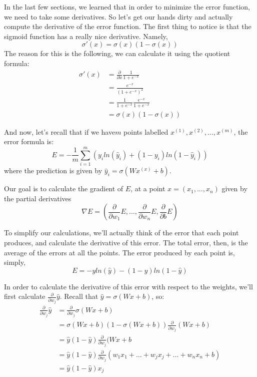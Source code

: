 In the last few sections, we learned that in order to minimize the error function, we need to take some derivatives. So let's get our hands dirty and actually compute the derivative of the error function. The first thing to notice is that the sigmoid function has a really nice derivative. Namely, \[\sigma'(x)=\sigma(x)(1-\sigma(x))\]
The reason for this is the following, we can calculate it using the quotient formula:
\[
\begin{split}
\sigma'(x) & = \frac{\partial}{\partial x} \frac{1}{1 + e^{-x}} \\
& = \frac{e^{-x}}{(1 + e^{-x})^2} \\
& = \frac{1}{1 + e^{-x}} \frac{e^{-x}}{1 + e^{-x}} \\
& = \sigma(x)(1-\sigma(x))
\end{split}
\]

And now, let's recall that if we have\(m\) points labelled \(x^{(1)}, x^{(2)}, ..., x^{(m)}\), the error formula is: \[E = -\frac{1}{m} \sum_{i=1}^m (y_i ln(\hat{y}_i) + (1 - y_i) ln(1 - \hat{y}_i))\]
where the prediction is given by \(\hat{y}_i = \sigma(Wx^{(x)} + b)\). \newline

Our goal is to calculate the gradient of \(E\), at a point \(x = (x_1, ..., x_n)\) given by the partial derivatives \[\nabla E = (\frac{\partial}{\partial w_1} E, …, \frac{\partial}{\partial w_n} E, \frac{\partial}{\partial b} E)\]

To simplify our calculations, we'll actually think of the error that each point produces, and calculate the derivative of this error. The total error, then, is the average of the errors at all the points. The error produced by each point is, simply,
\[E= -y ln(\hat{y}) - (1 - y) ln(1-\hat{y})\]

In order to calculate the derivative of this error with respect to the weights, we'll first calculate \(\frac{\partial}{\partial w_j} \hat{y}\). Recall that \(\hat{y}=\sigma(Wx+b)\), so:
\[
\begin{split}
    \frac{\partial}{\partial w_j} \hat{y} &= \frac{\partial}{\partial w_j} \sigma (Wx+b) \\
    &= \sigma{(Wx + b)}{(1 - \sigma(Wx +b))} \frac{\partial}{\partial w_j}{(Wx+b)} \\
    &= \hat{y} {(1-\hat{y})} \frac{\partial}{\partial w_j}{(Wx+b}\\
    &= \hat{y} {(1-\hat{y})} \frac{\partial}{\partial w_j} {(w_1 x_1 + ... + w_j x_j + ... + w_n x_n + b)} \\
    &= \hat{y} {(1-\hat{y})} x_j
\end{split}
\]

